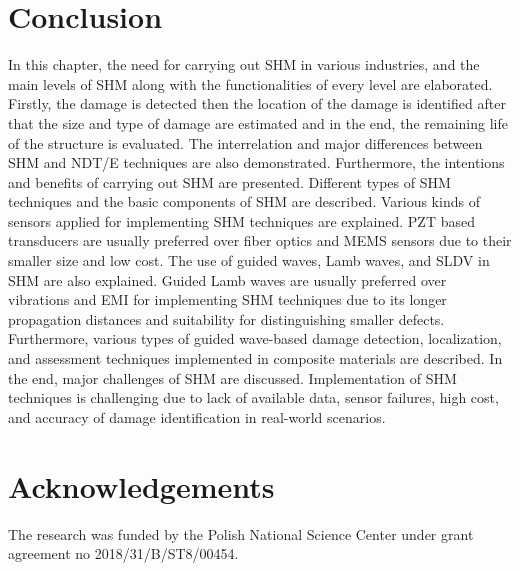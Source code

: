 \documentclass[b5paper, 11pt, titlepage]{book}
\begin{document}
\section{Conclusion}
In this chapter, the need for carrying out SHM in various industries, and the main levels of SHM along with the functionalities of every level are elaborated. Firstly, the damage is detected then the location of the damage is identified after that the size and type of damage are estimated and in the end, the remaining life of the structure is evaluated. The interrelation and major differences between SHM and NDT/E techniques are also demonstrated. Furthermore, the intentions and benefits of carrying out SHM are presented. Different types of SHM techniques and the basic components of SHM are described. Various kinds of sensors applied for implementing SHM techniques are explained. PZT based transducers are usually preferred over fiber optics and MEMS sensors due to their smaller size and low cost. The use of guided waves, Lamb waves, and SLDV in SHM are also explained. Guided Lamb waves are usually preferred over vibrations and EMI for implementing SHM techniques due to its longer propagation distances and suitability for distinguishing smaller defects. Furthermore, various types of guided wave-based damage detection, localization, and assessment techniques implemented in composite materials are described. In the end, major challenges of SHM are discussed. Implementation of SHM techniques is challenging due to lack of available data, sensor failures, high cost, and accuracy of damage identification in real-world scenarios.

\section*{Acknowledgements}

The research was funded by the Polish National Science Center under grant agreement no 2018/31/B/ST8/00454.

\end{document}
